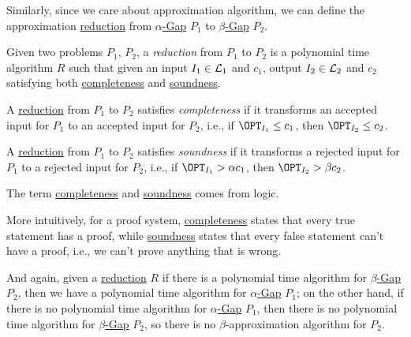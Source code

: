 Similarly, since we care about approximation algorithm, we can define the approximation \hyperref[def:reduction]{reduction} from \hyperref[def:Gap]{\(\alpha \)-Gap} \(P_1\) to \hyperref[def:Gap]{\(\beta \)-Gap} \(P_2\).

\begin{definition}[Reduction]\label{def:reduction}
	Given two problems \(P_1\), \(P_2\), a \emph{reduction} from \(P_1\) to \(P_2\) is a polynomial time algorithm \(R\) such that given an input \(I_1\in \mathcal{\MakeUppercase{l}}_1 \) and \(c_1\), output \(I_2\in \mathcal{\MakeUppercase{l}} _2\) and \(c_2\) satisfying both \hyperref[def:completeness]{completeness} and \hyperref[def:soundness]{soundness}.
	\begin{definition}[Completeness]\label{def:completeness}
		A \hyperref[def:reduction]{reduction} from \(P_1\) to \(P_2\) satisfies \emph{completeness} if it transforms an accepted input for \(P_1\) to an accepted input for \(P_2\), i.e., if \(\OPT_{I_1}\leq c_1\), then \(\OPT_{I_2}\leq c_2\).
	\end{definition}
	\begin{definition}[Soundness]\label{def:soundness}
		A \hyperref[def:reduction]{reduction} from \(P_1\) to \(P_2\) satisfies \emph{soundness} if it transforms a rejected input for \(P_1\) to a rejected input for \(P_2\), i.e., if \(\OPT_{I_1}> \alpha c_1\), then \(\OPT_{I_2}> \beta c_2\).
	\end{definition}
\end{definition}

\begin{remark}
	The term \hyperref[def:completeness]{completeness} and \hyperref[def:soundness]{soundness} comes from logic.
\end{remark}
\begin{explanation}
	More intuitively, for a proof system, \hyperref[def:completeness]{completeness} states that every true statement has a proof, while \hyperref[def:soundness]{soundness} states that every false statement can't have a proof, i.e., we can't prove anything that is wrong.
\end{explanation}

And again, given a \hyperref[def:reduction]{reduction} \(R\) if there is a polynomial time algorithm for \hyperref[def:Gap]{\(\beta \)-Gap} \(P_2\), then we have a polynomial time algorithm for \hyperref[def:Gap]{\(\alpha \)-Gap} \(P_1\); on the other hand, if there is no polynomial time algorithm for \hyperref[def:Gap]{\(\alpha \)-Gap} \(P_1\), then there is no polynomial time algorithm for \hyperref[def:Gap]{\(\beta \)-Gap} \(P_2\), so there is no \(\beta \)-approximation algorithm for \(P_2\).

